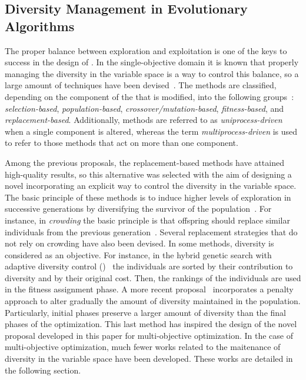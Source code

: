 

\subsection{Diversity Management in Evolutionary Algorithms}

The proper balance between exploration and exploitation is one of the keys to success in the design of \EAS{}.
%
In the single-objective domain it is known that properly managing the diversity in the variable space is a way to control this balance,
so a large amount of techniques have been devised~\cite{Mohan:14}.
%
The methods are classified, depending on the component of the \EA{} that is modified, into the following groups~\cite{Joel:Crepinsek}: \textit{selection-based}, \textit{population-based}, 
\textit{crossover/mutation-based}, \textit{fitness-based}, and \textit{replacement-based}.
%
Additionally, methods are referred to as \textit{uniprocess-driven} when a single component is altered, whereas the term
\textit{multiprocess-driven} is used to refer to those methods that act on more than one component.

Among the previous proposals, the replacement-based methods have attained high-quality results, so
this alternative was selected with the aim of designing a novel \MOEA{} incorporating an explicit way to control the diversity 
in the variable space.
%
The basic principle of these methods is to induce higher levels of exploration in successive generations by diversifying 
the survivor of the population~\cite{Segura:17}.
%
For instance, in \textit{crowding} the basic principle is that offspring should replace similar individuals from the previous generation~\cite{Mengshoel:14}.
%
Several replacement strategies that do not rely on crowding have also been devised.
%
In some methods, diversity is considered as an objective.
%
For instance, in the hybrid genetic search with adaptive diversity control (\HGSADC{})~\cite{Vidal:13} the individuals are sorted by their contribution to diversity and by their original cost.
%
Then, the rankings of the individuals are used in the fitness assignment phase.
%
A more recent proposal~\cite{Segura:17} incorporates a penalty approach to alter gradually the amount of diversity maintained in the population.
%
Particularly, initial phases preserve a larger amount of diversity than the final phases of the optimization.
%
This last method has inspired the design of the novel proposal developed in this paper for multi-objective optimization.
%
In the case of multi-objective optimization, much fewer works related to the maitenance of diversity in the variable space
have been developed.
%
These works are detailed in the following section.

